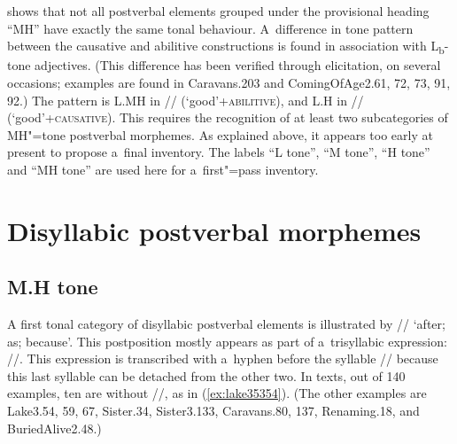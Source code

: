  shows that not all postverbal elements grouped under the provisional heading “MH” have exactly the same tonal behaviour. A~difference in tone pattern between the {causative} and {abilitive} constructions is found in association with L\textsubscript{b}-tone adjectives. (This difference has been verified through elicitation, on several occasions; examples are found in Caravans.203 and ComingOfAge2.61, 72, 73, 91, 92.) The pattern is L.MH in // (‘good’+\textsc{abilitive}), and L.H in // (‘good’+\textsc{causative}). This requires the recognition of at least two subcategories of MH"=tone postverbal morphemes. As explained above, it appears too early at present to propose a~final inventory. The labels “L tone”, “M tone”, “H tone” and “MH tone” are used here for a~first"=pass inventory.


\section{Disyllabic postverbal morphemes}
\label{sec:disyllabicsuffixes}


\subsection{M.H tone}
\label{sec:mhtone}

A first tonal category of disyllabic postverbal elements is illustrated by // ‘after; as;
because’. This postposition mostly appears as part of a~{trisyllabic} expression: //. This expression is
transcribed with a~hyphen before the syllable // because this last syllable can be
detached from the other two. In texts, out of 140 examples, ten are without //, as in (\ref{ex:lake35354}). (The other examples are Lake3.54,
59, 67, Sister.34, Sister3.133, Caravans.80, 137, Renaming.18, and
BuriedAlive2.48.) 



